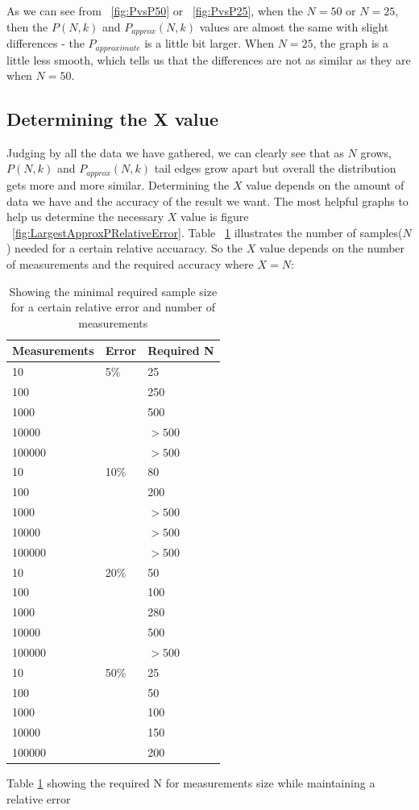 \documentclass[12pt]{article}
\begin{document}
As we can see from ~\ref{fig:PvsP50} or ~\ref{fig:PvsP25}, when the $N = 50$ or $N = 25$, then the $P(N, k)$ and $P_{approx}(N, k)$ values are almost the same with slight differences - the $P_{approximate}$ is a little bit larger. When $N = 25$, the graph is a little less smooth, which tells us that the differences are not as similar as they are when $N = 50$.

\subsection{Determining the X value}
Judging by all the data we have gathered, we can clearly see that as $N$ grows,  $P(N, k)$ and $P_{approx}(N, k)$ tail edges grow apart but overall the distribution gets more and more similar. Determining the $X$ value depends on the amount of data we have and the accuracy of the result we want. The most helpful graphs to help us determine the necessary $X$ value is figure ~\ref{fig:LargestApproxPRelativeError}. Table ~\ref{table:requiredN} illustrates the number of samples($N$) needed for a certain relative accuaracy. So the $X$ value depends on the number of measurements and the required accuracy where $X = N$:

\begin{table}[!h]
	\begin{center}
		\caption{Showing the minimal required sample size for a certain relative error and number of measurements}
	    \begin{tabular}{| l | l | l |}
	    \hline
		Measurements & Error & Required N \\
		\hline
		10 & 5\% & 25 \\
		100 & & 250 \\
		1000 & & 500 \\
		10000 & & $>500$ \\
		100000 & & $> 500$ \\
		\hline
		10  & 10\% & 80 \\
		100 & & 200 \\
		1000 & & $>500$ \\
		10000 & & $>500$ \\
		100000  & & $>500$ \\
		\hline
		10  & 20\% & 50 \\
		100 & & 100 \\
		1000  & & 280 \\
		10000  & & 500 \\
		100000  & & $>500$ \\
		\hline
		10  & 50\% &  25 \\
		100 & & 50 \\
		1000 & & 100 \\
		10000 & & 150 \\
		100000 & & 200 \\
		\hline
		\end{tabular}
		\label{table:requiredN}
	\end{center}
\end{table}
Table \ref{table:requiredN} showing the required N for measurements size while maintaining a relative error
\end{document}
